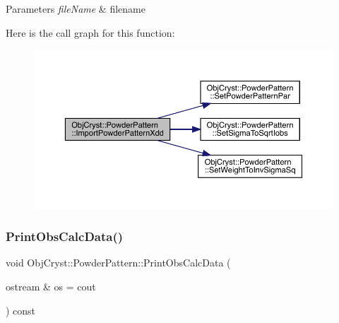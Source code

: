 \begin{DoxyParams}{Parameters}
{\em file\+Name} & filename \\
\hline
\end{DoxyParams}
Here is the call graph for this function\+:
\nopagebreak
\begin{figure}[H]
\begin{center}
\leavevmode
\includegraphics[width=350pt]{class_obj_cryst_1_1_powder_pattern_a4a8e1dc893c04a4451327d3f48f21d0e_cgraph}
\end{center}
\end{figure}
\mbox{\label{class_obj_cryst_1_1_powder_pattern_ac08650463b3ecba84111c105726f2420}} 
\subsubsection{\texorpdfstring{PrintObsCalcData()}{PrintObsCalcData()}}
{\footnotesize\ttfamily void Obj\+Cryst\+::\+Powder\+Pattern\+::\+Print\+Obs\+Calc\+Data (\begin{DoxyParamCaption}\item[{ostream \&}]{os = {\ttfamily cout} }\end{DoxyParamCaption}) const}

